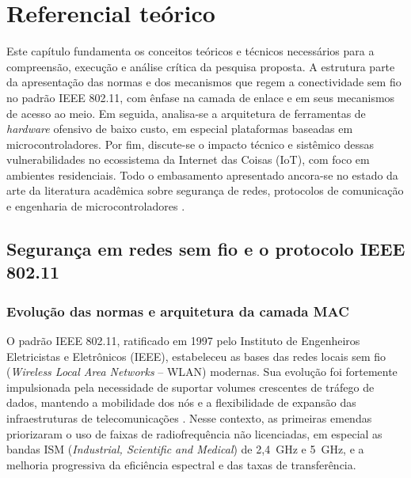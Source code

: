 \chapter{Referencial teórico}
\label{cap:fund_teorico}

Este capítulo fundamenta os conceitos teóricos e técnicos necessários para a compreensão, execução e análise crítica da pesquisa proposta. A estrutura parte da apresentação das normas e dos mecanismos que regem a conectividade sem fio no padrão IEEE 802.11, com ênfase na camada de enlace e em seus mecanismos de acesso ao meio. Em seguida, analisa-se a arquitetura de ferramentas de \textit{hardware} ofensivo de baixo custo, em especial plataformas baseadas em microcontroladores. Por fim, discute-se o impacto técnico e sistêmico dessas vulnerabilidades no ecossistema da Internet das Coisas (IoT), com foco em ambientes residenciais. Todo o embasamento apresentado ancora-se no estado da arte da literatura acadêmica sobre segurança de redes, protocolos de comunicação e engenharia de microcontroladores \cite{KohliosHayajneh2018,Amoordon2022,Hiertz2010,Lima2025}.

\section{Segurança em redes sem fio e o protocolo IEEE 802.11}

\subsection{Evolução das normas e arquitetura da camada MAC}

O padrão IEEE 802.11, ratificado em 1997 pelo Instituto de Engenheiros Eletricistas e Eletrônicos (IEEE), estabeleceu as bases das redes locais sem fio (\textit{Wireless Local Area Networks} – WLAN) modernas. Sua evolução foi fortemente impulsionada pela necessidade de suportar volumes crescentes de tráfego de dados, mantendo a mobilidade dos nós e a flexibilidade de expansão das infraestruturas de telecomunicações \cite{Hiertz2010}. Nesse contexto, as primeiras emendas priorizaram o uso de faixas de radiofrequência não licenciadas, em especial as bandas ISM (\textit{Industrial, Scientific and Medical}) de 2{,}4~GHz e 5~GHz, e a melhoria progressiva da eficiência espectral e das taxas de transferência.

